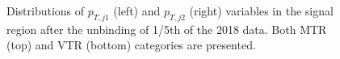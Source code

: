\begin{figure}[htbp]
{    }
  \caption{Distributions of $p_{T,j1}$ (left) and $p_{T,j2}$ (right) variables in the signal region after the unbinding of 1/5th of the 2018 data. Both MTR (top) and VTR (bottom) categories are presented.}
  \label{fig:jet_eta_preHornCut_2018}
\end{figure}




